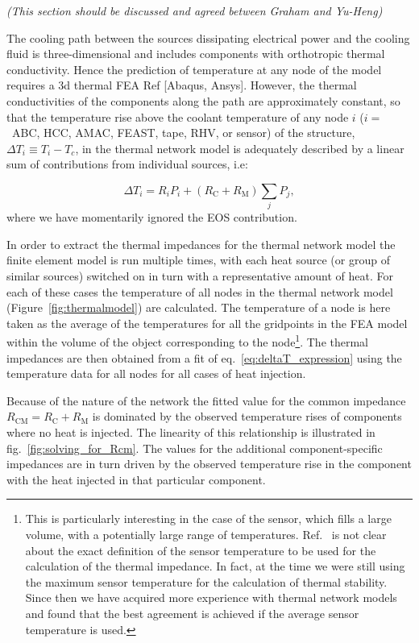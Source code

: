\textit{(This section should be discussed and agreed between Graham and Yu-Heng)}

The cooling path between the sources dissipating electrical power and the cooling fluid is three-dimensional and includes components with orthotropic thermal conductivity. Hence the prediction of temperature at any node of the model requires a 3d thermal FEA Ref [Abaqus, Ansys]. However, the thermal conductivities of the components along the path are approximately constant, so that the temperature rise above the coolant temperature of any node $i$ ($i=$~ABC, HCC, AMAC, FEAST, tape, RHV, or sensor) of the structure, \mbox{$\Delta T_i \equiv T_i - T_c$,} in the thermal network model is adequately described by a linear sum of contributions from individual sources, i.e:

\begin{equation}
\Delta T_i = R_i P_i + \left(R_\text{C} + R_\text{M}\right)\sum_j P_j, 
\label{eq:deltaT_expression}
\end{equation}
where we have momentarily ignored the EOS contribution.

In order to extract the thermal impedances for the thermal network model the finite element model is run multiple times, with each heat source (or group of similar sources) switched on in turn with a representative amount of heat. For each of these cases the temperature of all nodes in the thermal network model (Figure~\ref{fig:thermalmodel}) are calculated. The temperature of a node is here taken as the average of the temperatures for all the gridpoints in the FEA model within the volume of the object corresponding to the node\footnote{This is particularly interesting in the case of the sensor, which fills a large volume, with a potentially large range of temperatures. Ref.~\cite{Beck:2010zzd} is not clear about the exact definition of the sensor temperature to be used for the calculation of the thermal impedance. In fact, at the time we were still using the maximum sensor temperature for the calculation of thermal stability. Since then we have acquired more experience with thermal network models and found that the best agreement is achieved if the average sensor temperature is used.}. The thermal impedances are then obtained from a fit of eq.~\ref{eq:deltaT_expression} using the temperature data for all nodes for all cases of heat injection.

Because of the nature of the network the fitted value for the common impedance $R_\text{CM}=R_\text{C} + R_\text{M}$ is dominated by the observed temperature rises of components where no heat is injected. The linearity of this relationship is illustrated in fig.~\ref{fig:solving_for_Rcm}. The values for the additional component-specific impedances are in turn driven by the observed temperature rise in the component with the heat injected in that particular component.



